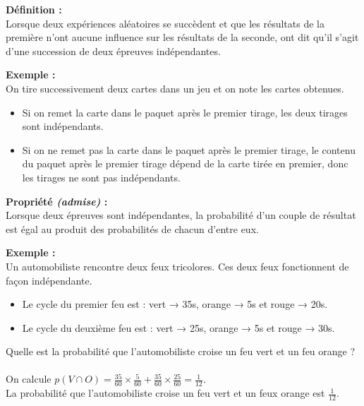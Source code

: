 \documentclass[11pt,a4paper]{article}
\begin{document}
\begin{mdframed}[style=definitionStyle]
  \textbf{Définition :} ~\\
  Lorsque deux expériences aléatoires se succèdent et que les résultats de la première n'ont aucune influence sur les résultats de la seconde, ont dit qu'il s'agit d'une succession de deux épreuves indépendantes.
\end{mdframed}

\textbf{Exemple :} ~\\
On tire successivement deux cartes dans un jeu et on note les cartes obtenues.
\begin{itemize}
  \item Si on remet la carte dans le paquet après le premier tirage, les deux tirages sont indépendants.
  \item Si on ne remet pas la carte dans le paquet après le premier tirage, le contenu du paquet après le premier tirage dépend de la carte tirée en premier, donc les tirages ne sont pas indépendants.
\end{itemize}

\newpage

\begin{mdframed}[style=proprieteStyle]
  \textbf{Propriété \emph{(admise)} :} ~\\
  Lorsque deux épreuves sont indépendantes, la probabilité d'un couple de résultat est égal au produit des probabilités de chacun d'entre eux.
\end{mdframed}

\textbf{Exemple :} ~\\
Un automobiliste rencontre deux feux tricolores. Ces deux feux fonctionnent de façon indépendante.
\begin{itemize}
  \item Le cycle du premier feu est : vert → 35s, orange → 5s et rouge → 20s.
  \item Le cycle du deuxième feu est : vert → 25s, orange → 5s et rouge → 30s.
\end{itemize}
Quelle est la probabilité que l'automobiliste croise un feu vert et un feu orange ? ~\\

On calcule $p(V\cap O)=\frac{35}{60}\times\frac{5}{60}+\frac{35}{60}\times\frac{25}{60}=\frac{1}{12}$.\\
La probabilité que l'automobiliste croise un feu vert et un feux orange est $\frac{1}{12}$.
\end{document}
